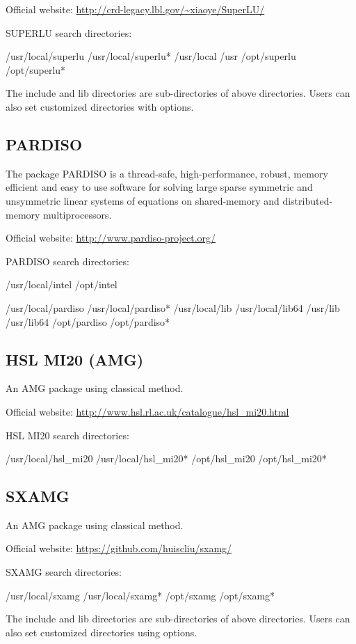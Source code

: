 Official website: \url{http://crd-legacy.lbl.gov/~xiaoye/SuperLU/}

SUPERLU search directories:
\begin{evb}
/usr/local/superlu
/usr/local/superlu*
/usr/local
/usr
/opt/superlu 
/opt/superlu*
\end{evb}

The include and lib directories are sub-directories of above directories. Users can also set customized directories with options.

\subsection{PARDISO}
The package PARDISO is a thread-safe, high-performance, robust, memory efficient and easy to use software for solving large sparse symmetric and unsymmetric linear systems of equations on shared-memory and distributed-memory multiprocessors. 

Official website: \url{http://www.pardiso-project.org/}

PARDISO search directories:
\begin{evb}
/usr/local/intel
/opt/intel

/usr/local/pardiso
/usr/local/pardiso*
/usr/local/lib
/usr/local/lib64 
/usr/lib
/usr/lib64
/opt/pardiso
/opt/pardiso*
\end{evb}

\subsection{HSL MI20 (AMG)}
An AMG package using classical method. 

Official website: \url{http://www.hsl.rl.ac.uk/catalogue/hsl_mi20.html}

HSL MI20 search directories:
\begin{evb}
/usr/local/hsl_mi20
/usr/local/hsl_mi20*
/opt/hsl_mi20
/opt/hsl_mi20*
\end{evb}

\subsection{SXAMG}
An AMG package using classical method. 

Official website: \url{https://github.com/huiscliu/sxamg/}

SXAMG search directories:
\begin{evb}
/usr/local/sxamg
/usr/local/sxamg*
/opt/sxamg
/opt/sxamg*
\end{evb}

The include and lib directories are sub-directories of above directories. Users can also set customized directories using options.


